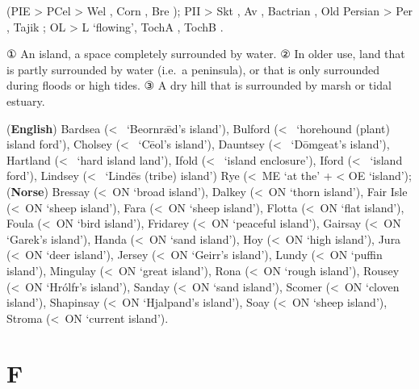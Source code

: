 \documentclass[12pt,letterpaper,oneside,article,draft]{memoir}
\begin{document}
\begin{Lemma}
\begin{Etymology}
				(PIE  > PCel  > Wel , Corn \fm{avon}, Bre );
			PII  > Skt  , Av  ,
				Bactrian  , Old Persian   >
					Per  , Tajik  ;
			OL  > L  ‘flowing’, TochA \fm{āp}, TochB .
\end{Etymology}
\begin{Definitions}
	① An island, a space completely surrounded by water.
	② In older use, land that is partly surrounded by water (i.e.\ a peninsula), or that is only surrounded during floods or high tides.
	③ A dry hill that is surrounded by marsh or tidal estuary.
\end{Definitions}
\begin{Examples}
	(\textbf{English})
	Bardsea (<~ ‘Beornrǣd’s island’),
	Bulford (<~ ‘horehound (plant) island ford’),
	Cholsey (<~ ‘Cēol’s island’),
	Dauntsey (<~ ‘Dōmgeat’s island’),
	Hartland (<~ ‘hard island land’),
	Ifold (<~ ‘island enclosure’),
	Iford (<~ ‘island ford’),
	Lindsey (<~ ‘Lindēs (tribe) island’)
	Rye (<~ME  ‘at the’ +  < OE  ‘island’);
	(\textbf{Norse})
	Bressay (<~ON  ‘broad island’),
	Dalkey (<~ON  ‘thorn island’),
	Fair Isle (<~ON  ‘sheep island’),
	Fara (<~ON  ‘sheep island’),
	Flotta (<~ON  ‘flat island’),
	Foula (<~ON  ‘bird island’),
	Fridarey (<~ON  ‘peaceful island’),
	Gairsay (<~ON  ‘Garek’s island’),
	Handa (<~ON  ‘sand island’),
	Hoy (<~ON  ‘high island’),
	Jura (<~ON  ‘deer island’),
	Jersey (<~ON  ‘Geirr’s island’),
	Lundy (<~ON  ‘puffin island’),
	Mingulay (<~ON  ‘great island’),
	Rona (<~ON  ‘rough island’),
	Rousey (<~ON  ‘Hrólfr’s island’),
	Sanday (<~ON  ‘sand island’),
	Scomer (<~ON  ‘cloven island’),
	Shapinsay (<~ON  ‘Hjalpand’s island’),
	Soay (<~ON  ‘sheep island’),
	Stroma (<~ON  ‘current island’).
\end{Examples}
\end{Lemma}

\section*{F}
\end{document}
